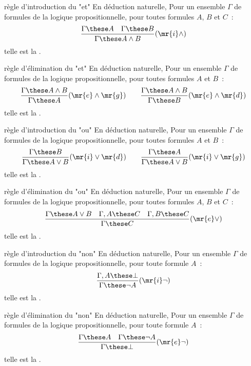 \begin{definition}{7.8}{règle d'introduction du "et"}
    En déduction naturelle, Pour un ensemble $\Gamma$ de formules de la logique propositionnelle, pour toutes formules $A$, $B$ et $C$~:
    $$\frac{\Gamma \these A \quad \Gamma \these B}{\Gamma \these A \wedge B}(\mr{i}\wedge)$$
    telle est la .
\end{definition}

\begin{definition}{7.9}{règle d'élimination du "et"}
    En déduction naturelle, Pour un ensemble $\Gamma$ de formules de la logique propositionnelle, pour toutes formules $A$ et $B$~:
    $$\frac{\Gamma \these A \wedge B}{\Gamma \these A}(\mr{e}\wedge\mr{g}) \qquad \frac{\Gamma \these A \wedge B}{\Gamma \these B}(\mr{e}\wedge\mr{d})$$
    telle est la .
\end{definition}

\newcommand{\ou}[0]{\vee}

\begin{definition}{7.10}{règle d'introduction du "ou"}
    En déduction naturelle, Pour un ensemble $\Gamma$ de formules de la logique propositionnelle, pour toutes formules $A$ et $B$~:
    $$\frac{\Gamma \these B}{\Gamma \these A \ou B}(\mr{i}\ou\mr{d}) \qquad \frac{\Gamma \these A}{\Gamma \these A \ou B}(\mr{i}\ou\mr{g})$$
    telle est la .
\end{definition}

\begin{definition}{7.11}{règle d'élimination du "ou"}
    En déduction naturelle, Pour un ensemble $\Gamma$ de formules de la logique propositionnelle, pour toutes formules $A$, $B$ et $C$~:
    $$\frac{\Gamma \these A \ou B \quad \Gamma,A \these C \quad \Gamma,B \these C}{\Gamma \these C}(\mr{e}\ou)$$
    telle est la .
\end{definition}

\begin{definition}{7.12}{règle d'introduction du "non"}
    En déduction naturelle, Pour un ensemble $\Gamma$ de formules de la logique propositionnelle, pour toute formule $A$~:
    $$\frac{\Gamma,A \these \bot}{\Gamma \these \lnot A}(\mr{i}\lnot)$$
    telle est la .
\end{definition}

\begin{definition}{7.13}{règle d'élimination du "non"}
    En déduction naturelle, Pour un ensemble $\Gamma$ de formules de la logique propositionnelle, pour toute formule $A$~:
    $$\frac{\Gamma \these A \quad \Gamma \these \lnot A}{\Gamma \these \bot}(\mr{e}\lnot)$$
    telle est la .
\end{definition}

